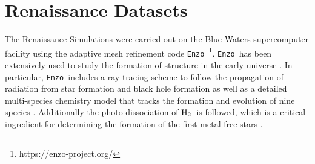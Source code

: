\documentclass[graphics, twocolumn, usenatbib]{mn2e}
\newcommand{\enzo}{\texttt{Enzo~}}
\newcommand{\molH} {$\rm{H_2}$~}
\begin{document}
\section{Renaissance Datasets} \label{Sec:RenaissanceDatasets}
The Renaissance Simulations were carried out on the Blue Waters supercomputer facility using the
adaptive mesh refinement code \enzo\citep{Enzo_2014, Enzo_2019}\footnote{https://enzo-project.org/}.
\enzo has been extensively used to study the formation of structure in the early universe
\citep{Abel_2002, OShea_2005b, Turk_2012, Wise_2012b, Wise_2014, Regan_2015, Regan_2017}. In
particular, \enzo includes a ray-tracing scheme to follow the propagation of radiation from star
formation and
black hole formation \citep{WiseAbel_2011} as well as a detailed multi-species chemistry model that
tracks the formation and evolution of nine species \citep{Anninos_1997, Abel_1997, Grackle}.
Additionally the photo-dissociation of \molH is followed, which is a critical ingredient for
determining the formation of the first metal-free stars \citep{Abel_2000}. 
\end{document}
